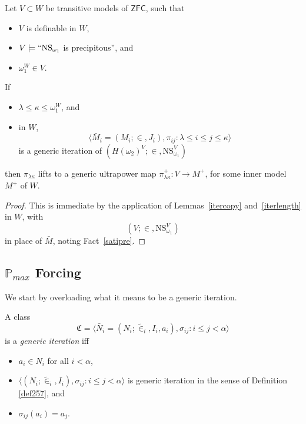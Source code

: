 \documentclass[12pt]{article}
\numberwithin{equation}{section}
\begin{document}
\begin{lem}\label{lift}
Let $V \subset W$ be transitive models of $\mathsf{ZFC}$, such that 
\begin{itemize}
    \item $V$ is definable in $W$,
    \item $V \models ``\mathrm{NS}_{\omega_1}$ is precipitous'', and
    \item $\omega_1^W \in V$.
\end{itemize}
If 
\begin{itemize}
    \item $\lambda \leq \kappa \leq \omega_1^W$, and
    \item in $W$, $$\langle \bar{M}_i = (M_i; \in, J_i), \pi_{ij} : \lambda \leq i \leq j \leq \kappa \rangle$$ is a generic iteration of $(H(\omega_2)^V; \in, \mathrm{NS}_{\omega_1}^V)$
\end{itemize}
then $\pi_{\lambda \kappa}$ lifts to a generic ultrapower map $\pi^{+}_{\lambda \kappa} : V \longrightarrow M^+$, for some inner model $M^+$ of $W$.
\end{lem}
\begin{proof}
This is immediate by the application of Lemmas~\ref{itercopy} and~\ref{iterlength} in $W$, with $$(V; \in, \mathrm{NS}_{\omega_1}^V)$$ in place of $\bar{M}$, noting Fact~\ref{satipre}.
\end{proof}

\subsection{\texorpdfstring{$\mathbb{P}_{max}$}{P-max} Forcing}\label{ss27}

We start by overloading what it means to be a generic iteration.

\begin{defi}\label{def269}
A class
\begin{equation*}
    \mathfrak{C} = \langle \bar{N}_i = (N_i; \tilde{\in}_i, I_i, a_i), \sigma_{ij} : i \leq j < \alpha \rangle
\end{equation*}
is a \emph{generic iteration} iff
\begin{itemize}
    \item $a_i \in N_i$ for all $i < \alpha$,
    \item $\langle (N_i; \tilde{\in}_i, I_i), \sigma_{ij} : i \leq j < \alpha \rangle$ is generic iteration in the sense of Definition \ref{def257}, and
    \item $\sigma_{ij}(a_i) = a_j$.
\end{itemize}
\end{defi}
\end{document}
